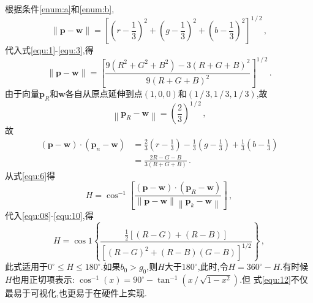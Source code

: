 根据条件\eqref{enum:a}和\eqref{enum:b},
\begin{equation}
  \|\symbf{p}-\symbf{w}\|=\left[\left(r-\frac{1}{3}\right)^{2}+\left(g-\frac{1}{3}\right)^{2}+\left(b-\frac{1}{3}\right)^{2}\right]^{1 \,/\, 2}\,,
\end{equation}
代入式\eqref{equ:1}-\eqref{equ:3},得
\begin{equation}\label{equ:08}
  \|\symbf{p}-\symbf{w}\|=\left[\frac{9\left(R^{2}+G^{2}+B^{2}\right)-3(R+G+B)^{2}}{9(R+G+B)^{2}}\right]^{1 \,/ \,2}\,.
  \end{equation}
由于向量$\symbf{p}_R$和$\symbf{w}$各自从原点延伸到点$(1,0,0)$和$(1\,/\,3,1\,/\,3,1\,/\,3)$,故
\begin{equation}
  \left\|\symbf{p}_{R}-\symbf{w}\right\|=\left(\frac{2}{3}\right)^{1 \,/\, 2}\,,
\end{equation}
故
\begin{equation}
  \begin{aligned}\label{equ:10}
  (\symbf{p}-\symbf{w}) \cdot\left(\symbf{p}_{n}-\symbf{w}\right) &=\frac{2}{3}\left(r-\frac{1}{3}\right)-\frac{1}{3}\left(g-\frac{1}{3}\right)+\frac{1}{3}\left(b-\frac{1}{3}\right) \\
  &=\frac{2 R-G-B}{3(R+G+B)}\,.
  \end{aligned}
\end{equation}
从式\eqref{equ:6}得
\begin{equation}
  H=\cos ^{-1}\left[\frac{(\symbf{p}-\symbf{w}) \cdot\left(\symbf{p}_{R}-\symbf{w}\right)}{\|\symbf{p}-\symbf{w}\|\left\|\symbf{p}_{k}-\symbf{w}\right\|}\right]\,,
\end{equation}
代入\eqref{equ:08}-\eqref{equ:10},得
\begin{equation}\label{equ:12}
  H=\cos 1\left\{\frac{\frac{1}{2}[(R-G)+(R-B)]}{\left[(R-G)^{2}+(R-B)(G-B)\right]^{1 / 2}}\right\}\,,
\end{equation}
此式适用于$0^{\circ}\leqslant H \leqslant 180^{\circ}$.如果$b_0>g_0$,则$H$大于$180^{\circ}$,此时,令$H=360^{\circ}-H$.有时候$H$也用正切项表示: $\cos ^{-1}(x)=90^{\circ}-\tan ^{-1}\left(x \,/\, \sqrt{1-x^{2}}\right)$.但
式\eqref{equ:12}不仅最易于可视化,也更易于在硬件上实现.


